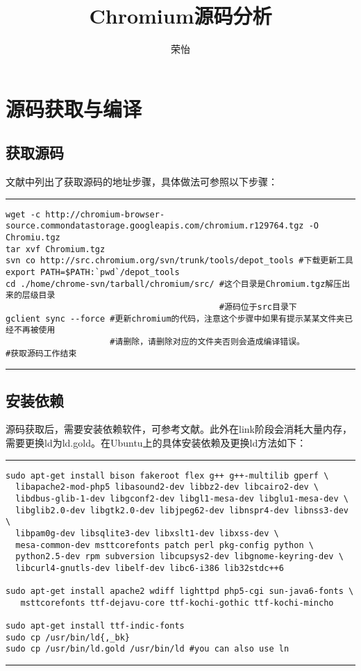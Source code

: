

\title{Chromium源码分析}
\author{荣怡}
\maketitle

\section{源码获取与编译}

\subsection{获取源码}

文献\cite{url:getcode}中列出了获取源码的地址\cite{url:downloadpage}步骤，具体做法可参照以下步骤：
\vspace{0.4cm}
\hrule
\begin{verbatim}
wget -c http://chromium-browser-source.commondatastorage.googleapis.com/chromium.r129764.tgz -O Chromiu.tgz
tar xvf Chromium.tgz
svn co http://src.chromium.org/svn/trunk/tools/depot_tools #下载更新工具
export PATH=$PATH:`pwd`/depot_tools
cd ./home/chrome-svn/tarball/chromium/src/ #这个目录是Chromium.tgz解压出来的层级目录
                                           #源码位于src目录下
gclient sync --force #更新chromium的代码，注意这个步骤中如果有提示某某文件夹已经不再被使用
                     #请删除，请删除对应的文件夹否则会造成编译错误。
#获取源码工作结束
\end{verbatim}
\hrule{}
\vspace{0.4cm}

\subsection{安装依赖}

源码获取后，需要安装依赖软件，可参考文献\cite{url:installdeps}。此外在link阶段会消耗大量内存，需要更换ld为ld.gold。在Ubuntu上的具体安装依赖及更换ld方法如下：
\vspace{0.4cm}
\hrule{}
\begin{verbatim}
sudo apt-get install bison fakeroot flex g++ g++-multilib gperf \
  libapache2-mod-php5 libasound2-dev libbz2-dev libcairo2-dev \
  libdbus-glib-1-dev libgconf2-dev libgl1-mesa-dev libglu1-mesa-dev \
  libglib2.0-dev libgtk2.0-dev libjpeg62-dev libnspr4-dev libnss3-dev \
  libpam0g-dev libsqlite3-dev libxslt1-dev libxss-dev \
  mesa-common-dev msttcorefonts patch perl pkg-config python \
  python2.5-dev rpm subversion libcupsys2-dev libgnome-keyring-dev \
  libcurl4-gnutls-dev libelf-dev libc6-i386 lib32stdc++6

sudo apt-get install apache2 wdiff lighttpd php5-cgi sun-java6-fonts \
   msttcorefonts ttf-dejavu-core ttf-kochi-gothic ttf-kochi-mincho

sudo apt-get install ttf-indic-fonts
sudo cp /usr/bin/ld{,_bk}
sudo cp /usr/bin/ld.gold /usr/bin/ld #you can also use ln
\end{verbatim}
\vspace{0.4cm}
\hrule{}


